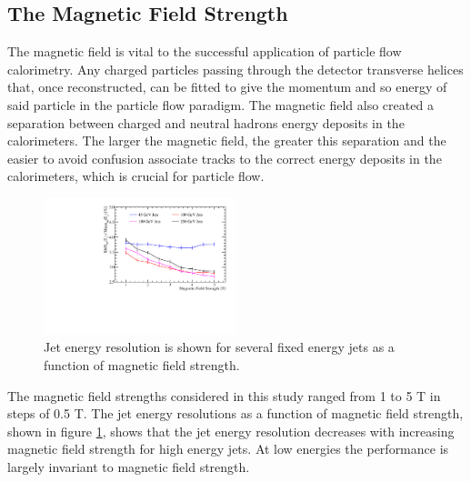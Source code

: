 
\subsection{The Magnetic Field Strength}
\label{sec:bfield}
The magnetic field is vital to the successful application of particle flow calorimetry.  Any charged particles passing through the detector transverse helices that, once reconstructed, can be fitted to give the momentum and so energy of said particle in the particle flow paradigm.  The magnetic field also created a separation between charged and neutral hadrons energy deposits in the calorimeters.  The larger the magnetic field, the greater this separation and the easier to avoid confusion associate tracks to the correct energy deposits in the calorimeters, which is crucial for particle flow.

\begin{figure}
\includegraphics[width=0.5\textwidth]{OptimisationStudies/Plots/JetEnergyResolutions/JER_vs_MagneticFieldStrength.pdf}
\caption[Jet energy resolution as a function of magnetic field strength.]{Jet energy resolution is shown for several fixed energy jets as a function of magnetic field strength.}
\label{fig:bfield}
\end{figure}

The magnetic field strengths considered in this study ranged from 1 to 5 T in steps of 0.5 T.  The jet energy resolutions as a function of magnetic field strength, shown in figure \ref{fig:bfield}, shows that the jet energy resolution decreases with increasing magnetic field strength for high energy jets.  At low energies the performance is largely invariant to magnetic field strength.  

